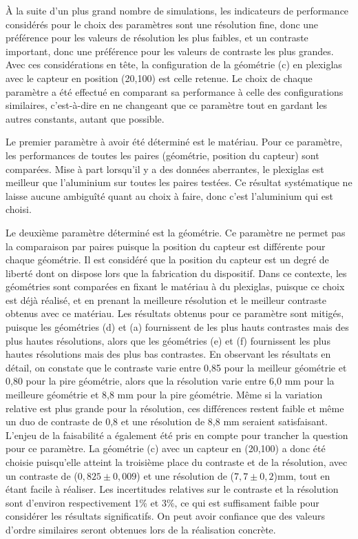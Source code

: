 \documentclass[conference]{IEEEtran}
\begin{document}
À la suite d'un plus grand nombre de simulations, les indicateurs de performance 
considérés pour le choix des paramètres sont une résolution fine, donc une 
préférence pour les valeurs de résolution les plus faibles, et un contraste 
important, donc une préférence pour les valeurs de contraste les plus grandes.
Avec ces considérations en tête, la configuration de la géométrie (c) en plexiglas 
avec le capteur en position (20,100) est celle retenue. Le choix de chaque paramètre
a été effectué en comparant sa performance à celle des configurations similaires, 
c'est-à-dire en ne changeant que ce paramètre tout en gardant les autres constants,
autant que possible.

Le premier paramètre à avoir été déterminé est le matériau. Pour ce paramètre, 
les performances de toutes les paires (géométrie, position du capteur) sont 
comparées. Mise à part lorsqu'il y a des données aberrantes, le plexiglas est 
meilleur que l'aluminium sur toutes les paires testées. Ce résultat systématique 
ne laisse aucune ambiguîté quant au choix à faire, donc c'est l'aluminium qui est 
choisi.

Le deuxième paramètre déterminé est la géométrie. Ce paramètre ne permet pas la 
comparaison par paires puisque la position du capteur est différente pour chaque 
géométrie. Il est considéré que la position du capteur est un degré de liberté 
dont on dispose lors que la fabrication du dispositif. Dans ce contexte, les
géométries sont comparées en fixant le matériau à du plexiglas, puisque ce choix
est déjà réalisé, et en prenant la meilleure résolution et le meilleur contraste
obtenus avec ce matériau. Les résultats obtenus pour ce paramètre sont mitigés, 
puisque les géométries (d) et (a) fournissent de les plus hauts contrastes mais des 
plus hautes résolutions, alors que les géométries (e) et (f) fournissent les plus 
hautes résolutions mais des plus bas contrastes. En observant les résultats en 
détail, on constate que le contraste varie entre 0,85 pour la meilleur géométrie 
et 0,80 pour la pire géométrie, alors que la résolution varie entre 6,0 mm pour la 
meilleure géométrie et 8,8 mm pour la pire géométrie. Même si la variation relative 
est plus grande pour la résolution, ces différences restent faible et même un duo 
de contraste de 0,8 et une résolution de 8,8 mm seraient satisfaisant. L'enjeu de la
faisabilité a également été pris en compte pour trancher la question pour ce 
paramètre. La géométrie (c) avec un capteur en (20,100) a donc été choisie 
puisqu'elle atteint la troisième place du contraste et de la résolution, avec un 
contraste de ($0,825 \pm 0,009$) et une résolution de ($7,7 \pm 0,2$)mm, tout en 
étant facile à réaliser. Les incertitudes relatives sur le contraste et la 
résolution sont d'environ respectivement 1\% et 3\%, ce qui est suffisament 
faible pour considérer les résultats significatifs. On peut avoir confiance que 
des valeurs d'ordre similaires seront obtenues lors de la réalisation concrète.
\end{document}
